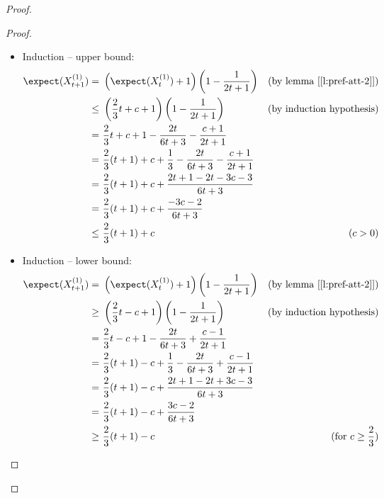 \begin{proof}
\begin{proof}
\begin{itemize}
            \item Induction -- upper bound:
            \begin{align*}
                \expect(X_{t + 1}^{(1)}) =&\ \left( \expect(X_t^{(1)}) + 1 \right) \left( 1 - \frac{1}{2t + 1} \right)  & \text{(by lemma [\ref{l:pref-att-2}])} \\
                \leq&\ \left( \frac{2}{3}t + c + 1 \right) \left( 1 - \frac{1}{2t + 1} \right)                          & \text{(by induction hypothesis)} \\
                   =&\ \frac{2}{3}t + c + 1 - \frac{2t}{6t + 3} - \frac{c + 1}{2t + 1}                                  & \\
                   =&\ \frac{2}{3} (t + 1) + c + \frac{1}{3} - \frac{2t}{6t + 3} - \frac{c + 1}{2t + 1}                 & \\
                   =&\ \frac{2}{3} (t + 1) + c + \frac{2t + 1 - 2t - 3c - 3}{6t + 3}                                    & \\
                   =&\ \frac{2}{3} (t + 1) + c + \frac{- 3c - 2}{6t + 3}                                                & \\
                \leq&\ \frac{2}{3} (t + 1) + c                                                                          & (c > 0)
            \end{align*}

            \item Induction -- lower bound:
            \begin{align*}
                \expect(X_{t + 1}^{(1)}) =&\ \left( \expect(X_t^{(1)}) + 1 \right) \left( 1 - \frac{1}{2t + 1} \right)  & \text{(by lemma [\ref{l:pref-att-2}])} \\
                \geq&\ \left( \frac{2}{3}t - c + 1 \right) \left( 1 - \frac{1}{2t + 1} \right)                          & \text{(by induction hypothesis)} \\
                   =&\ \frac{2}{3}t - c + 1 - \frac{2t}{6t + 3} + \frac{c - 1}{2t + 1}                                  & \\
                   =&\ \frac{2}{3}(t + 1) - c + \frac{1}{3} - \frac{2t}{6t + 3} + \frac{c - 1}{2t + 1}                  & \\
                   =&\ \frac{2}{3}(t + 1) - c + \frac{2t + 1 - 2t + 3c - 3}{6t + 3}                                     & \\
                   =&\ \frac{2}{3}(t + 1) - c + \frac{3c - 2}{6t + 3}                                                   & \\
                \geq&\ \frac{2}{3}(t + 1) - c                                                                           & \text{(for $c \geq \frac{2}{3}$)}
            \end{align*}


\end{itemize}
\end{proof}
\end{proof}

